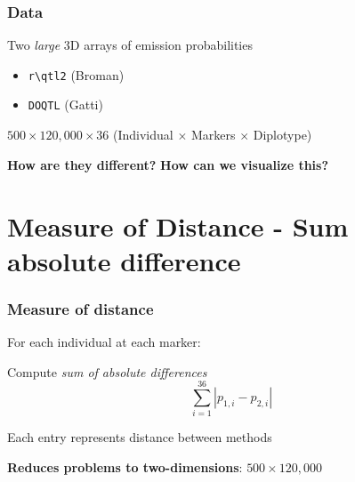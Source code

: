 \documentclass[12pt,t]{beamer}
\begin{document}
	\begin{frame}
		\frametitle{Data}
		\vspace{0.3in}
		Two \textit{large} 3D arrays of emission probabilities \\
		
		\vspace{0.25in}

		\begin{itemize}
			\item \texttt{r\textbackslash qtl2} (Broman)
			\item \texttt{DOQTL} (Gatti) \\
		\end{itemize}
		
		\vspace{0.25in}

		\pause $500 \times 120,000 \times 36$ \qquad (Individual $\times$ Markers $\times$ Diplotype)
		
		\vspace{0.25in}
		
		\pause \textbf{How are they different?}\newline
		\pause \textbf{How can we visualize this?}

	\end{frame}

\section{Measure of Distance  - Sum absolute difference}
	\begin{frame}
		\frametitle{Measure of distance}
		
		\vspace{0.3in}
		\pause For each individual at each marker: \newline
		
		Compute \textit{sum of absolute differences} 
		$$\sum_{i=1}^{36} |p_{1,i} - p_{2,i}|$$
		
		\pause Each entry represents distance between methods \newline
		
		\pause \textbf{Reduces problems to two-dimensions}: \pause $500 \times 120,000$ \newline
		
	\end{frame}
	
\end{document}
